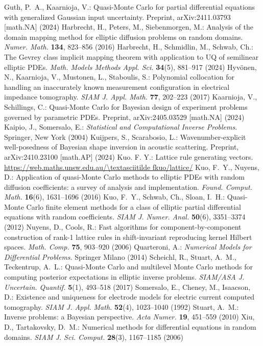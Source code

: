 \documentclass[graybox]{svmult}
\begin{document}
\begin{thebibliography}{99}
 Guth, P.~A., Kaarnioja, V.: Quasi-Monte Carlo for partial differential equations with generalized Gaussian input uncertainty. Preprint, arXiv:2411.03793 [math.NA] (2024)
 Harbrecht, H., Peters, M., Siebenmorgen, M.: Analysis of the domain mapping method for elliptic diffusion problems on random domains. {\em Numer. Math.} \textbf{134}, 823--856 (2016)
 Harbrecht, H., Schmidlin, M., Schwab, Ch.: The Gevrey class implicit mapping theorem with application to UQ of semilinear elliptic PDEs. {\em Math. Models Methods Appl. Sci.} \textbf{34}(5), 881--917 (2024)
 Hyv\"onen, N., Kaarnioja, V., Mustonen, L., Staboulis, S.: Polynomial collocation for handling an inaccurately known measurement configuration in electrical impedance tomography. \emph{SIAM J. Appl. Math.} \textbf{77}, 202--223 (2017)
 Kaarnioja, V., Schillings, C.: Quasi-Monte Carlo for Bayesian design of experiment problems governed by parametric PDEs. Preprint, arXiv:2405.03529 [math.NA] (2024)
 Kaipio, J., Somersalo, E.: {\em Statistical and Computational Inverse Problems}. Springer, New York (2004)
 Kuijpers, S., Scarabosio, L.: Wavenumber-explicit well-posedness of Bayesian shape inversion in acoustic scattering. Preprint, arXiv:2410.23100 [math.AP] (2024)
 Kuo. F. Y.: Lattice rule generating vectors.\\
\url{https://web.maths.unsw.edu.au/\textasciitilde fkuo/lattice/}
 Kuo, F.~Y., Nuyens, D.: Application of quasi-Monte Carlo methods to elliptic PDEs with random diffusion coefficients: a survey of analysis and implementation. \emph{Found. Comput. Math.} \textbf{16}(6), 1631--1696 (2016)
 Kuo, F.~Y., Schwab, Ch., Sloan, I.~H.: Quasi-Monte Carlo finite element methods for a class of elliptic partial differential equations with random coefficients. {\em SIAM J. Numer. Anal.} {\bf 50}(6), 3351--3374 (2012)
 Nuyens, D., Cools, R.: Fast algorithms for component-by-component construction of rank-1 lattice rules in shift-invariant reproducing kernel Hilbert spaces. {\em Math. Comp.} \textbf{75}, 903--920 (2006)
 Quarteroni, A.: {\em Numerical Models for Differential Problems}. Springer Milano (2014)
Scheichl, R., Stuart, A.~M., Teckentrup, A.~L.: Quasi-Monte Carlo and multilevel Monte Carlo methods for computing posterior expectations in elliptic inverse problems. {\em SIAM/ASA J. Uncertain. Quantif.} \textbf{5}(1), 493--518 (2017)
 Somersalo, E., Cheney, M., Isaacson, D.: Existence and uniqueness for electrode models for electric current computed tomography. \emph{SIAM J. Appl. Math.} \textbf{52}(4), 1023--1040 (1992)
 Stuart, A.~M.: Inverse problems: a Bayesian perspective. {\em Acta Numer.} \textbf{19}, 451--559 (2010)
 Xiu, D., Tartakovsky, D.~M.: Numerical methods for differential equations in random domains. \emph{SIAM J. Sci. Comput.} \textbf{28}(3), 1167--1185 (2006)
\end{thebibliography}
\end{document}
